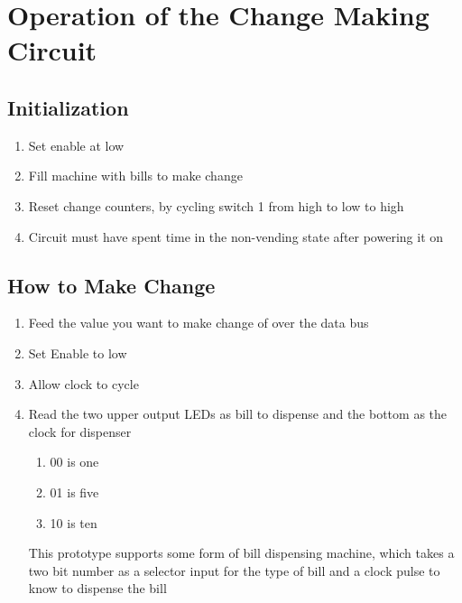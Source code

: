 \section{Operation of the Change Making Circuit}

\subsection{Initialization}
\begin{enumerate}
\item{Set enable at low}
\item{Fill machine with bills to make change}
\item{Reset change counters, by cycling switch 1 from high to low to high}
\item{Circuit must have spent time in the non-vending state after powering it on}
\end{enumerate}

\subsection{How to Make Change}
\begin{enumerate}
\item{Feed the value you want to make change of over the data bus}
\item{Set Enable to low}
\item{Allow clock to cycle}
\item{Read the two upper output LEDs as bill to dispense and the bottom as the clock for dispenser}
\begin{enumerate}
\item{00 is one}
\item{01 is five}
\item{10 is ten}
\end{enumerate}
This prototype supports some form of bill dispensing machine, which takes a two bit number as a selector input for the type of bill and a clock pulse to know to dispense the bill
\end{enumerate}

